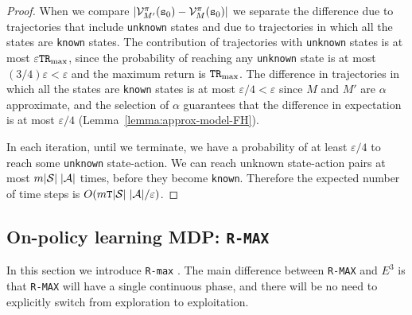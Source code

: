 \begin{proof}
When we compare
$|\mathcal{V}^\pi_{M'}({\tt s}_0)-\mathcal{V}^\pi_M({\tt s}_0)|$ we
separate the difference due to trajectories that include \texttt{unknown} states and due to trajectories in which all the states are \texttt{known} states. 
The contribution of trajectories with  \texttt{unknown} states is at most $\varepsilon{\tt T}{\tt R}_{\max }$,
since the probability of reaching any \texttt{unknown} state is at most
$(3/4)\varepsilon<\varepsilon$ and the maximum return is
${\tt T}{\tt R}_{\max }$. The difference in trajectories in which all the states are \texttt{known} states is at most
$\varepsilon/4<\varepsilon$ since $M$ and $M'$ are $\alpha$
approximate, and the selection of $\alpha$ guarantees that the
difference in expectation is at most $\varepsilon/4$
(Lemma~\ref{lemma:approx-model-FH}).

In each iteration, until we terminate, we have a probability of at
least $\varepsilon/4$ to reach some \texttt{unknown} state-action. We can reach
unknown state-action pairs at most $m |\mathcal{S}|\;|\mathcal{A}|$ times, before they become \texttt{known}.
Therefore the expected number of time steps is  $O(m{\tt T}
|\mathcal{S}|\;|\mathcal{A}|/\varepsilon)$.
\end{proof}




\subsection{On-policy learning MDP: {\tt R-MAX}}

In this section we introduce {\tt R-max} \cite{BrafmanT02}. The main difference
between {\tt R-MAX} and $E^3$ is that {\tt R-MAX} will have a single
continuous phase, and there will be no need to explicitly switch
from exploration to exploitation.

